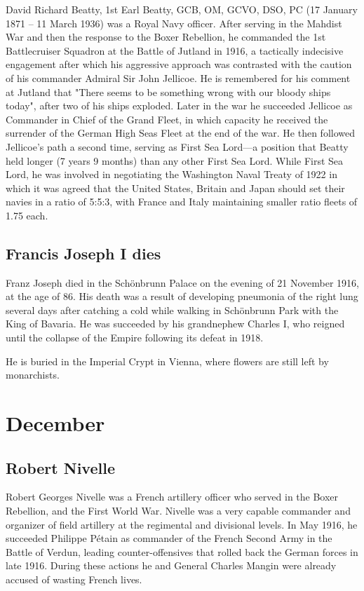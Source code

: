 \documentclass[a4paper,]{book}
\begin{document}
David Richard Beatty, 1st Earl Beatty, GCB, OM, GCVO, DSO, PC (17 January 1871 – 11 March 1936) was a Royal Navy officer. After serving in the Mahdist War and then the response to the Boxer Rebellion, he commanded the 1st Battlecruiser Squadron at the Battle of Jutland in 1916, a tactically indecisive engagement after which his aggressive approach was contrasted with the caution of his commander Admiral Sir John Jellicoe. He is remembered for his comment at Jutland that "There seems to be something wrong with our bloody ships today", after two of his ships exploded. Later in the war he succeeded Jellicoe as Commander in Chief of the Grand Fleet, in which capacity he received the surrender of the German High Seas Fleet at the end of the war. He then followed Jellicoe's path a second time, serving as First Sea Lord—a position that Beatty held longer (7 years 9 months) than any other First Sea Lord. While First Sea Lord, he was involved in negotiating the Washington Naval Treaty of 1922 in which it was agreed that the United States, Britain and Japan should set their navies in a ratio of 5:5:3, with France and Italy maintaining smaller ratio fleets of 1.75 each. 

\section{Francis Joseph I dies}

Franz Joseph died in the Schönbrunn Palace on the evening of 21 November 1916, at the age of 86. His death was a result of developing pneumonia of the right lung several days after catching a cold while walking in Schönbrunn Park with the King of Bavaria. He was succeeded by his grandnephew Charles I, who reigned until the collapse of the Empire following its defeat in 1918.

He is buried in the Imperial Crypt in Vienna, where flowers are still left by monarchists.


\chapter{December}

\section{Robert Nivelle}

Robert Georges Nivelle  was a French artillery officer who served in the Boxer Rebellion, and the First World War. Nivelle was a very capable commander and organizer of field artillery at the regimental and divisional levels. In May 1916, he succeeded Philippe Pétain as commander of the French Second Army in the Battle of Verdun, leading counter-offensives that rolled back the German forces in late 1916. During these actions he and General Charles Mangin were already accused of wasting French lives.
\end{document}
